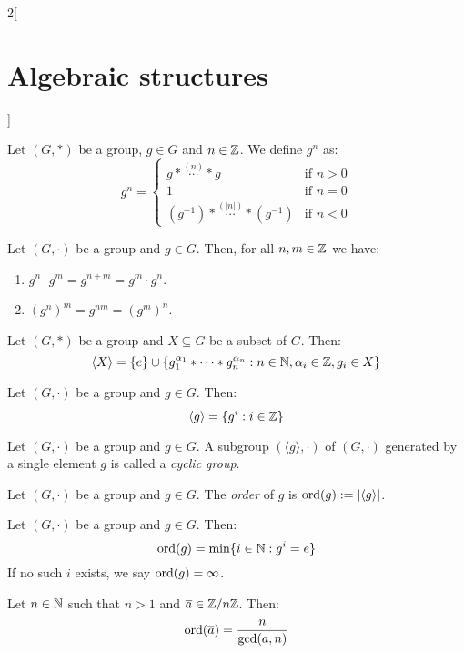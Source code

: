 \documentclass[../../../main_math.tex]{subfiles}
\begin{document}
\begin{multicols}{2}[\section{Algebraic structures}]
\begin{definition}
  \end{definition}
  \begin{definition}
    Let $(G,*)$ be a group, $g\in G$ and $n\in\mathbb{Z} $. We define $g^n$ as:
    $$g^n=
      \begin{cases}
        g*\overset{(n)}{\cdots}* g                & \text{if }n>0 \\
        1                                         & \text{if }n=0 \\
        (g^{-1})*\overset{(|n|)}{\cdots}*(g^{-1}) & \text{if }n<0
      \end{cases}$$
  \end{definition}
  \begin{lemma}
    Let $(G,\cdot)$ be a group and $g\in G$. Then, for all $n,m\in\mathbb{Z} $ we have:
    \begin{enumerate}
      \item $g^n\cdot g^m=g^{n+m}=g^m\cdot g^n$.
      \item $(g^n)^m=g^{nm}=(g^m)^n$.
    \end{enumerate}
  \end{lemma}
  \begin{proposition}
    Let $(G,*)$ be a group and $X\subseteq G$ be a subset of $G$. Then: $$\langle X\rangle=\{e\}\cup\{g_1^{\alpha_1}*\cdots* g_n^{\alpha_n}:n\in\mathbb{N} ,\alpha_i\in\mathbb{Z} ,g_i\in X\}$$
  \end{proposition}
  \begin{corollary}
    Let $(G,\cdot)$ be a group and $g\in G$. Then: $$\langle g\rangle=\{g^i:i\in\mathbb{Z} \}$$
  \end{corollary}
  \begin{definition}
    Let $(G,\cdot)$ be a group and $g\in G$. A subgroup $(\langle g\rangle,\cdot)$ of $(G,\cdot)$ generated by a single element $g$ is called a \emph{cyclic group}.
  \end{definition}
  \begin{definition}
    Let $(G,\cdot)$ be a group and $g\in G$. The \emph{order} of $g$ is $\operatorname{ord}(g):=|\langle g\rangle|$.
  \end{definition}
  \begin{proposition}
    Let $(G,\cdot)$ be a group and $g\in G$. Then: $$\operatorname{ord}(g)=\min\{i\in\mathbb{N} :g^i=e\}$$
    If no such $i$ exists, we say $\operatorname{ord}(g)=\infty$.
  \end{proposition}
  \begin{corollary}
    Let $n\in\mathbb{N} $ such that $n>1$ and $\overline{a}\in\mathbb{Z} /n\mathbb{Z} $. Then: $$\operatorname{ord}(\overline{a})=\frac{n}{\gcd(a,n)}$$
  \end{corollary}

\end{multicols}
\end{document}
